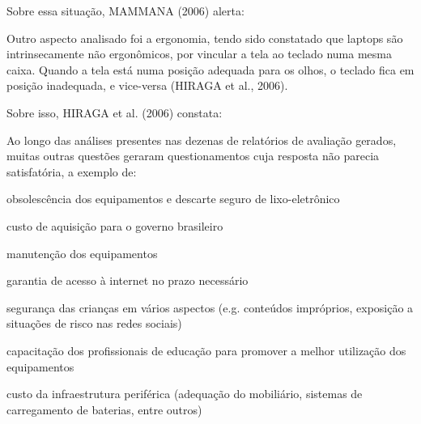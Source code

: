 \documentclass[
12pt,		%
openright,	%
twoside,  %
a4paper,			%
chapter=TITLE,		%
english,			%
french,				%
spanish,			%
brazil				%
]{USPSC-classe/USPSC}
\begin{document}
Sobre essa situa\c{c}\~ao,  MAMMANA (2006) alerta:





\noindent\begin{center}\mbox{\centering{}}\end{center}


Outro aspecto analisado foi a ergonomia, tendo sido constatado que laptops s\~ao intrinsecamente n\~ao ergon\^omicos, por vincular a tela ao teclado numa mesma \textquotedbl caixa\textquotedbl . Quando a tela est\'a numa posi\c{c}\~ao adequada para os olhos, o teclado fica em posi\c{c}\~ao inadequada, e vice-versa  (HIRAGA et al., 2006).




Sobre isso,  HIRAGA et al. (2006) constata:





\noindent\begin{center}\mbox{\centering{}}\end{center}


Ao longo das an\'alises presentes nas dezenas de relat\'orios de avalia\c{c}\~ao gerados, muitas outras quest\~oes geraram questionamentos cuja resposta n\~ao parecia satisfat\'oria, a exemplo de:





\begin{alineas}
\item obsolesc\^encia dos equipamentos e descarte seguro de lixo-eletr\^onico
\item custo de aquisi\c{c}\~ao para o governo brasileiro
\item manuten\c{c}\~ao dos equipamentos
\item garantia de acesso \`a internet no prazo necess\'ario
\item seguran\c{c}a das crian\c{c}as em v\'arios aspectos (e.g. conte\'udos impr\'oprios, exposi\c{c}\~ao a situa\c{c}\~oes de risco nas redes sociais)
\item capacita\c{c}\~ao dos profissionais de educa\c{c}\~ao para promover a melhor utiliza\c{c}\~ao dos equipamentos
\item custo da infraestrutura perif\'erica (adequa\c{c}\~ao do mobili\'ario, sistemas de carregamento de baterias, entre outros)
\end{alineas}
\end{document}
